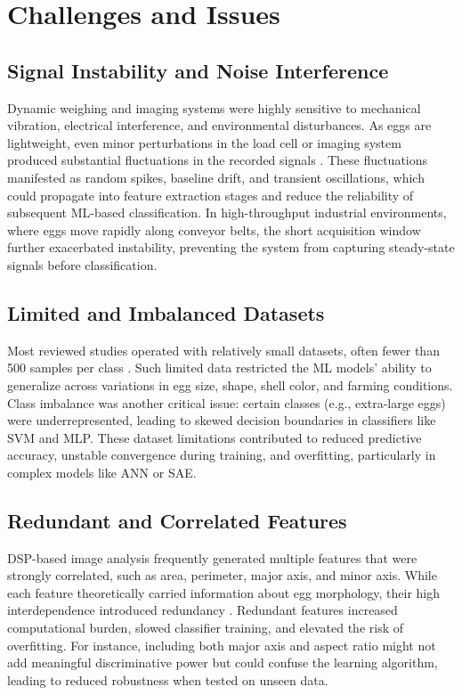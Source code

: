 \documentclass[conference]{IEEEtran}
\begin{document}
	
	\section{Challenges and Issues}
	
	\subsection{Signal Instability and Noise Interference}
	
	Dynamic weighing and imaging systems were highly sensitive to mechanical vibration, electrical interference, and environmental disturbances. As eggs are lightweight, even minor perturbations in the load cell or imaging system produced substantial fluctuations in the recorded signals \cite{yabanova2017}. These fluctuations manifested as random spikes, baseline drift, and transient oscillations, which could propagate into feature extraction stages and reduce the reliability of subsequent ML-based classification. In high-throughput industrial environments, where eggs move rapidly along conveyor belts, the short acquisition window further exacerbated instability, preventing the system from capturing steady-state signals before classification.
	
	\subsection{Limited and Imbalanced Datasets}
	
	Most reviewed studies operated with relatively small datasets, often fewer than 500 samples per class \cite{asadi2010}\cite{nasir2018}. Such limited data restricted the ML models’ ability to generalize across variations in egg size, shape, shell color, and farming conditions. Class imbalance was another critical issue: certain classes (e.g., extra-large eggs) were underrepresented, leading to skewed decision boundaries in classifiers like SVM and MLP. These dataset limitations contributed to reduced predictive accuracy, unstable convergence during training, and overfitting, particularly in complex models like ANN or SAE.
	
	\subsection{Redundant and Correlated Features}
	
	DSP-based image analysis frequently generated multiple features that were strongly correlated, such as area, perimeter, major axis, and minor axis. While each feature theoretically carried information about egg morphology, their high interdependence introduced redundancy \cite{soltani2015}. Redundant features increased computational burden, slowed classifier training, and elevated the risk of overfitting. For instance, including both major axis and aspect ratio might not add meaningful discriminative power but could confuse the learning algorithm, leading to reduced robustness when tested on unseen data.
	
\end{document}
